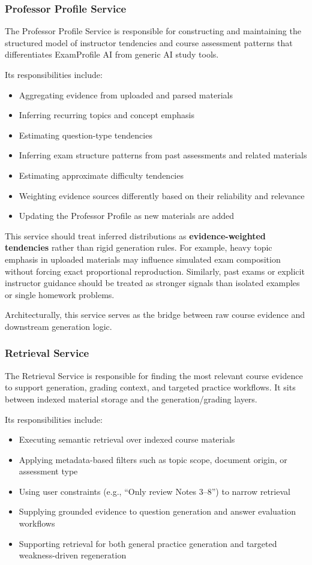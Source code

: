\documentclass[11pt]{article}
\begin{document}
\subsubsection{Professor Profile Service}
The Professor Profile Service is responsible for constructing and maintaining the structured model of instructor tendencies and course assessment patterns that differentiates ExamProfile AI from generic AI study tools.

Its responsibilities include:
\begin{itemize}
\item Aggregating evidence from uploaded and parsed materials
\item Inferring recurring topics and concept emphasis
\item Estimating question-type tendencies
\item Inferring exam structure patterns from past assessments and related materials
\item Estimating approximate difficulty tendencies
\item Weighting evidence sources differently based on their reliability and relevance
\item Updating the Professor Profile as new materials are added
\end{itemize}

This service should treat inferred distributions as \textbf{evidence-weighted tendencies} rather than rigid generation rules. For example, heavy topic emphasis in uploaded materials may influence simulated exam composition without forcing exact proportional reproduction. Similarly, past exams or explicit instructor guidance should be treated as stronger signals than isolated examples or single homework problems.

Architecturally, this service serves as the bridge between raw course evidence and downstream generation logic.

\subsubsection{Retrieval Service}
The Retrieval Service is responsible for finding the most relevant course evidence to support generation, grading context, and targeted practice workflows. It sits between indexed material storage and the generation/grading layers.

Its responsibilities include:
\begin{itemize}
\item Executing semantic retrieval over indexed course materials
\item Applying metadata-based filters such as topic scope, document origin, or assessment type
\item Using user constraints (e.g., ``Only review Notes 3--8'') to narrow retrieval
\item Supplying grounded evidence to question generation and answer evaluation workflows
\item Supporting retrieval for both general practice generation and targeted weakness-driven regeneration
\end{itemize}
\end{document}
